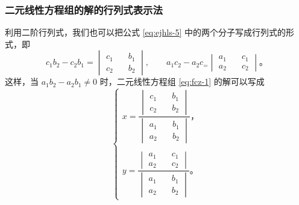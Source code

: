 \subsubsection{二元线性方程组的解的行列式表示法}

利用二阶行列式，我们也可以把公式 \eqref{eq:ejhls-5} 中的两个分子写成行列式的形式，即
$$
c_1b_2 - c_2b_1 = \begin{vmatrix}
    c_1 \quad & b_1 \\
    c_2 \quad & b_2
\end{vmatrix}, \qquad
a_1c_2 - a_2c_ = \begin{vmatrix}
    a_1 \quad & c_1 \\
    a_2 \quad & c_2
\end{vmatrix} \text{。}
$$
这样，当 $a_1b_2 - a_2b_1 \neq 0$ 时，二元线性方程组 \eqref{eq:fcz-1} 的解可以写成
\begin{equation}
    \begin{cases}
        x = \dfrac{
                \begin{vmatrix}
                    c_1 \quad & b_1 \\
                    c_2 \quad & b_2
                \end{vmatrix}
            }{
                \begin{vmatrix}
                    a_1 \quad & b_1 \\
                    a_2 \quad & b_2
                \end{vmatrix}
            } \text{，} \\
        \\
        y = \dfrac{
                \begin{vmatrix}
                    a_1 \quad & c_1 \\
                    a_2 \quad & c_2
                \end{vmatrix}
            }{
                \begin{vmatrix}
                    a_1 \quad & b_1 \\
                    a_2 \quad & b_2
                \end{vmatrix}
            } \text{。}
    \end{cases} \label{eq:ejhls-8}
\end{equation}

